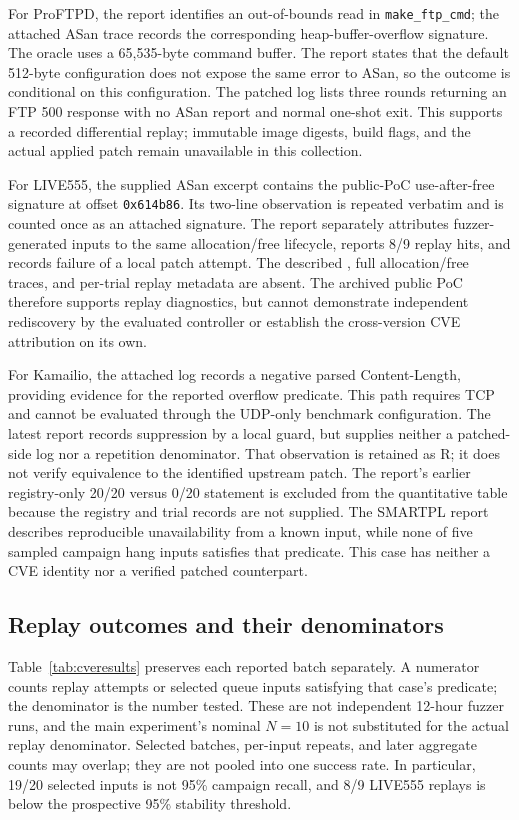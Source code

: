 For ProFTPD, the report identifies an out-of-bounds read in \texttt{make\_ftp\_cmd}; the attached ASan trace records the corresponding heap-buffer-overflow signature. The oracle uses a 65,535-byte command buffer. The report states that the default 512-byte configuration does not expose the same error to ASan, so the outcome is conditional on this configuration. The patched log lists three rounds returning an FTP 500 response with no ASan report and normal one-shot exit. This supports a recorded differential replay; immutable image digests, build flags, and the actual applied patch remain unavailable in this collection.

For LIVE555, the supplied ASan excerpt contains the public-PoC use-after-free signature at offset \texttt{0x614b86}. Its two-line observation is repeated verbatim and is counted once as an attached signature. The report separately attributes fuzzer-generated inputs to the same allocation/free lifecycle, reports 8/9 replay hits, and records failure of a local patch attempt. The described , full allocation/free traces, and per-trial replay metadata are absent. The archived public PoC therefore supports replay diagnostics, but cannot demonstrate independent rediscovery by the evaluated controller or establish the cross-version CVE attribution on its own.

For Kamailio, the attached log records a negative parsed Content-Length, providing evidence for the reported overflow predicate. This path requires TCP and cannot be evaluated through the UDP-only benchmark configuration. The latest report records suppression by a local guard, but supplies neither a patched-side log nor a repetition denominator. That observation is retained as R; it does not verify equivalence to the identified upstream patch. The report's earlier registry-only 20/20 versus 0/20 statement is excluded from the quantitative table because the registry and trial records are not supplied. The SMARTPL report describes reproducible unavailability from a known input, while none of five sampled campaign hang inputs satisfies that predicate. This case has neither a CVE identity nor a verified patched counterpart.

\subsection{Replay outcomes and their denominators}
Table~\ref{tab:cveresults} preserves each reported batch separately. A numerator counts replay attempts or selected queue inputs satisfying that case's predicate; the denominator is the number tested. These are not independent 12-hour fuzzer runs, and the main experiment's nominal $N=10$ is not substituted for the actual replay denominator. Selected batches, per-input repeats, and later aggregate counts may overlap; they are not pooled into one success rate. In particular, 19/20 selected inputs is not 95\% campaign recall, and 8/9 LIVE555 replays is below the prospective 95\% stability threshold.


